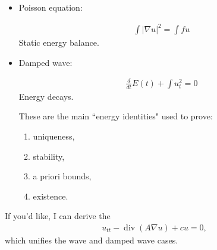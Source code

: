 \documentclass[12pt,a4paper]{report}
\begin{document}
\begin{description}
\begin{description}
\begin{itemize}
    \item Poisson equation:

\begin{align*}
\boxed{
\int |\nabla u|^2=\int fu
}
\end{align*}
Static energy balance.

    \item Damped wave:

\begin{align*}
\boxed{
\frac{d}{dt}E(t)+\int u_t^2=0
}
\end{align*}
Energy decays.

These are the main ``energy identities" used to prove:
\begin{enumerate}
\item uniqueness,
\item stability,
\item a priori bounds,
\item existence.
\end{enumerate}
	\end{itemize}

\end{description}

If you'd like, I can derive the 
\begin{align*}
u_{tt}-\operatorname{div}(A\nabla u)+cu=0,
\end{align*}
which unifies the wave and damped wave cases.


\end{description} %
\end{document}
